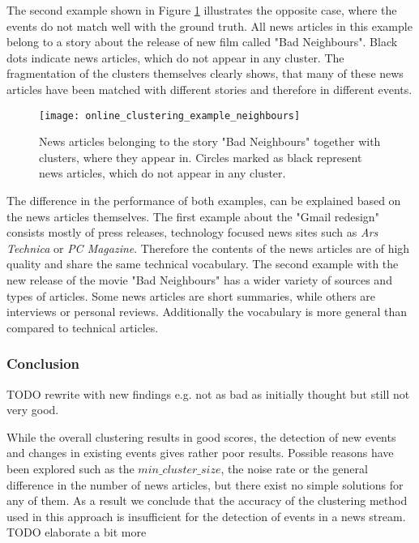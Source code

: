 The second example shown in Figure \ref{fig:online_clustering_example_neighbours} illustrates the opposite case, where the events do not match well with the ground truth. All news articles in this example belong to a story about the release of new film called "Bad Neighbours". Black dots indicate news articles, which do not appear in any cluster. The fragmentation of the clusters themselves clearly shows, that many of these news articles have been matched with different stories and therefore in different events. 

\begin{figure}[h]
    \centering
    \texttt{[image: online\_clustering\_example\_neighbours]}
    \caption{News articles belonging to the story "Bad Neighbours" together with clusters, where they appear in. Circles marked as black represent news articles, which do not appear in any cluster.}
    \label{fig:online_clustering_example_neighbours}
\end{figure}

The difference in the performance of both examples, can be explained based on the news articles themselves. The first example about the "Gmail redesign" consists mostly of press releases, technology focused news sites such as \textit{Ars Technica} or \textit{PC Magazine}. Therefore the contents of the news articles are of high quality and share the same technical vocabulary. The second example with the new release of the movie "Bad Neighbours" has a wider variety of sources and types of articles. Some news articles are short summaries, while others are interviews or personal reviews. Additionally the vocabulary is more general than compared to technical articles. 

\subsubsection{Conclusion}

TODO rewrite with new findings e.g. not as bad as initially thought but still not very good.

While the overall clustering results in good scores, the detection of new events and changes in existing events gives rather poor results. Possible reasons have been explored such as the $min\_cluster\_size$, the noise rate or the general difference in the number of news articles, but there exist no simple solutions for any of them. As a result we conclude that the accuracy of the clustering method used in this approach is insufficient for the detection of events in a news stream. TODO elaborate a bit more